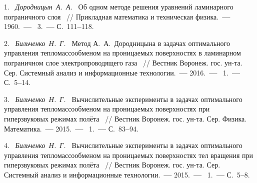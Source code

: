 \litlist



1.~%
\textit%
{Дородницын~А.~А.~} 
{%
 {Об  одном  методе  решения  
 уравнений  ламинарного  пограничного  слоя}%
~/$\!$/ 
 {Прикладная  математика  
  и  техническая  физика}.~{\textbf{---}} 
  1960.~{\textbf{---}} 
  \No~3.~{\textbf{---}} 
  С.~111{\textbf{--}}118.%
  }  



2.~%
\textit%
{Бильченко~Н.~Г.~} 
{%
  {Метод  А.~А.~Дородницына  
  в  задачах  оптимального  управления 
  тепломассообменом  на  проницаемых  поверхностях 
  в  ламинарном  пограничном  слое  
  электропроводящего  газа}%
~/$\!$/ 
  Вестник  Воронеж.  гос.  ун-та. 
  Сер.  Системный  анализ  
  и  информационные  технологии.~{\textbf{---}} 
  2016.~{\textbf{---}} 
  \No~1.~{\textbf{---}} 
  С.~5{\textbf{--}}14.%
  }



3.~%
\textit%
{Бильченко~Н.~Г.~} 
{%
 {Вычислительные  
  эксперименты 
  в  
  задачах  
  оптимального  
  управления  
  тепломассообменом 
  на  проницаемых  поверхностях 
  при  гиперзвуковых  режимах  полёта}%
~/$\!$/ 
  Вестник  Воронеж.  гос.  ун-та. 
  Сер.  Физика.  Математика.~{\textbf{---}}
  2015.~{\textbf{---}} 
  \No~1.~{\textbf{---}} 
  С.~83{\textbf{--}}94.%
  }



4.~%
\textit%
{Бильченко~Н.~Г.~}  
{%
  {Вычислительные  
   эксперименты  
   в  
   задачах  
   оптимального  
   управления 
   тепломассообменом  
   на  проницаемых  поверхностях 
   тел  вращения  
   при  гиперзвуковых  режимах  полёта}%
~/$\!$/ 
  Вестник  Воронеж.  гос.  ун-та. 
  Сер.  Системный  анализ 
  и  информационные  технологии.~{\textbf{---}} 
  2015.~{\textbf{---}} 
  \No~1.~{\textbf{---}} 
  С.~5{\textbf{--}}8.%
  }

